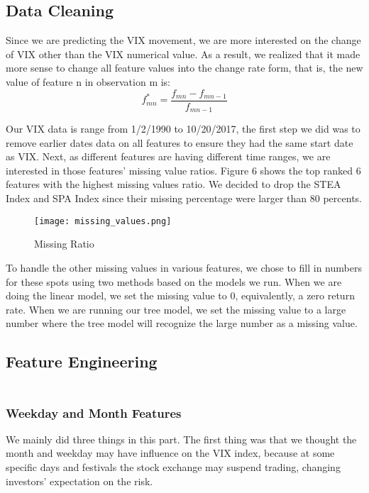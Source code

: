 \documentclass[fleqn,10pt]{SelfArx} %
\begin{document}
\subsection{Data Cleaning}
Since we are predicting the VIX movement, we are more interested on the change of VIX other than the VIX numerical value. As a result, we realized that it made more sense to change all feature values into the change rate form, that is, the new value of feature n in observation m is:
$$f^*_{mn} = \frac{f_{mn} - f_{mn-1}}{f_{mn-1}}$$

\noindent
Our VIX data is range from 1/2/1990 to 10/20/2017, the first step we did was to remove earlier dates data on all features to ensure they had the same start date as VIX. Next, as different features are having different time ranges, we are interested in those features' missing value ratios. Figure 6 shows the top ranked 6 features with the highest missing values ratio. We decided to drop the STEA Index and SPA Index since their missing percentage were larger than 80 percents.

\begin{figure}[h]\centering %
\texttt{[image: missing\_values.png]}
\caption{Missing Ratio}
\label{fig:view}
\end{figure}

\noindent
To handle the other missing values in various features, we chose to fill in numbers for these spots using two methods based on the models we run. When we are doing the linear model, we set the missing value to 0, equivalently, a zero return rate. When we are running our tree model, we set the missing value to a large number where the tree model will recognize the large number as a missing value.

\subsection{Feature Engineering}
\subsubsection*{\\Weekday and Month Features}
We mainly did three things in this part. The first thing was that we thought the month and weekday may have influence on the VIX index, because at some specific days and festivals the stock exchange may suspend trading, changing investors' expectation on the risk.
\end{document}
